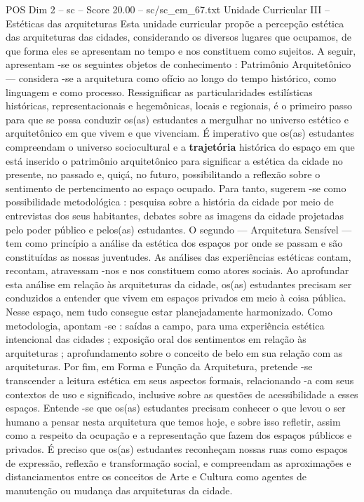 \begin{textsample}{POS Dim 2 – sc – Score 20.00 – sc/sc\_em\_67.txt}
Unidade Curricular III – Estéticas das arquiteturas Esta unidade curricular propõe a percepção estética das arquiteturas das cidades, considerando os diversos lugares que ocupamos, de que forma eles se apresentam no tempo e nos constituem como sujeitos.
A seguir, apresentam -se os seguintes objetos de conhecimento : Patrimônio Arquitetônico — considera -se a arquitetura como ofício ao longo do tempo histórico, como linguagem e como processo.
Ressignificar as particularidades estilísticas históricas, representacionais e hegemônicas, locais e regionais, é o primeiro passo para que se possa conduzir os(as) estudantes a mergulhar no universo estético e arquitetônico em que vivem e que vivenciam.
É imperativo que os(as) estudantes compreendam o universo sociocultural e a \textbf{trajetória} histórica do espaço em que está inserido o patrimônio arquitetônico para significar a estética da cidade no presente, no passado e, quiçá, no futuro, possibilitando a reflexão sobre o sentimento de pertencimento ao espaço ocupado.
Para tanto, sugerem -se como possibilidade metodológica : pesquisa sobre a história da cidade por meio de entrevistas dos seus habitantes, debates sobre as imagens da cidade projetadas pelo poder público e pelos(as) estudantes.
O segundo — Arquitetura Sensível — tem como princípio a análise da estética dos espaços por onde se passam e são constituídas as nossas juventudes.
As análises das experiências estéticas contam, recontam, atravessam -nos e nos constituem como atores sociais.
Ao aprofundar esta análise em relação às arquiteturas da cidade, os(as) estudantes precisam ser conduzidos a entender que vivem em espaços privados em meio à coisa pública.
Nesse espaço, nem tudo consegue estar planejadamente harmonizado.
Como metodologia, apontam -se : saídas a campo, para uma experiência estética intencional das cidades ; exposição oral dos sentimentos em relação às arquiteturas ; aprofundamento sobre o conceito de belo em sua relação com as arquiteturas.
Por fim, em Forma e Função da Arquitetura, pretende -se transcender a leitura estética em seus aspectos formais, relacionando -a com seus contextos de uso e significado, inclusive sobre as questões de acessibilidade a esses espaços.
Entende -se que os(as) estudantes precisam conhecer o que levou o ser humano a pensar nesta arquitetura que temos hoje, e sobre isso refletir, assim como a respeito da ocupação e a representação que fazem dos espaços públicos e privados.
É preciso que os(as) estudantes reconheçam nossas ruas como espaços de expressão, reflexão e transformação social, e compreendam as aproximações e distanciamentos entre os conceitos de Arte e Cultura como agentes de manutenção ou mudança das arquiteturas da cidade.

\end{textsample}
